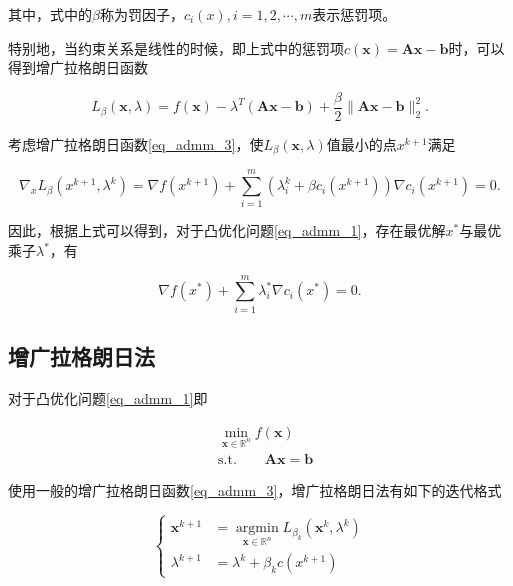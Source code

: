 其中，式中的$\beta$称为罚因子，$c_{i}(x), i=1, 2, \cdots, m$表示惩罚项。

特别地，当约束关系是线性的时候，即上式中的惩罚项$c(\bm{x})=\bm{Ax}-\bm{b}$时，可以得到增广拉格朗日函数

\begin{equation}\label{eq_admm_4}
    L_{\beta}(\bm{x}, \lambda) = f(\bm{x}) - \lambda^{T}(\bm{Ax}-\bm{b})+\frac{\beta}{2}\|\bm{Ax}-\bm{b}\|_{2}^{2}.
\end{equation}

考虑增广拉格朗日函数\ref{eq_admm_3}，使$L_{\beta}(\bm{x}, \lambda)$值最小的点$x^{k+1}$满足

\begin{equation*}
    \nabla_{x} L_{\beta}(x^{k+1}, \lambda^{k}) = \nabla f(x^{k+1}) + \sum_{i=1}^{m} (\lambda_{i}^{k}+\beta c_{i}(x^{k+1})) \nabla c_{i}(x^{k+1}) = 0.
\end{equation*}

因此，根据上式可以得到，对于凸优化问题\ref{eq_admm_1}，存在最优解$x^{*}$与最优乘子$\lambda^{*}$，有

\begin{equation}
    \nabla f(x^{*}) + \sum_{i=1}^{m}\lambda_{i}^{*}\nabla c_{i}(x^{*}) = 0.
\end{equation}

\subsection{增广拉格朗日法}

对于凸优化问题\ref{eq_admm_1}即

\begin{equation*}
    \begin{split}
        &\min\limits_{\bm{x}\in \mathbb{R}^{n}} f(\bm{x}) \\
        &\mathrm{s. t.} \quad\quad \bm{Ax} = \bm{b}
    \end{split}
\end{equation*}

使用一般的增广拉格朗日函数\ref{eq_admm_3}，增广拉格朗日法有如下的迭代格式

\begin{equation}\label{eq_admm_5}
    \begin{cases}
        \bm{x}^{k+1} &= \mathop{\mathrm{argmin}}\limits_{\bm{x}\in \mathbb{R}^{n}} L_{\beta_{k}}(\bm{x}^{k}, \lambda^{k}) \\
        \lambda^{k+1} &= \lambda^{k} + \beta_{k} c(x^{k+1})
    \end{cases}
\end{equation}

